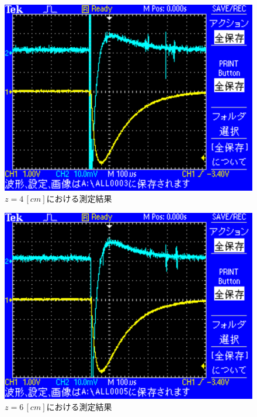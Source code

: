 \begin{figure}[H]
    \centering
    \includegraphics[scale=0.5]{images-3.pdf}
    \caption{$z=4\,[cm]$における測定結果}
\end{figure}

\begin{figure}[H]
    \centering
    \includegraphics[scale=0.5]{images-4.pdf}
    \caption{$z=6\,[cm]$における測定結果}
\end{figure}

